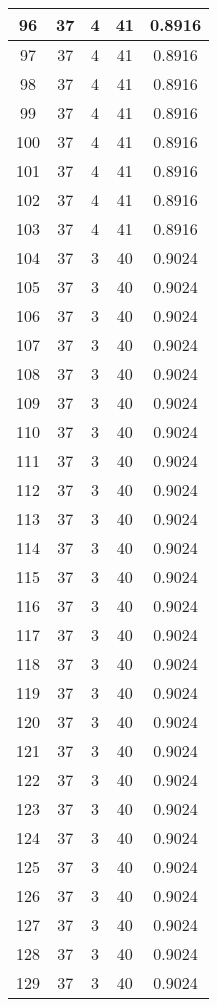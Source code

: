 \documentclass[letterpaper, 12pt]{article}
\begin{document}
\begin{longtable}{|c|c|c|c|c|}
\hline
96 & 37 & 4 & 41 & 0.8916 \\
\hline
97 & 37 & 4 & 41 & 0.8916 \\
\hline
98 & 37 & 4 & 41 & 0.8916 \\
\hline
99 & 37 & 4 & 41 & 0.8916 \\
\hline
100 & 37 & 4 & 41 & 0.8916 \\
\hline
101 & 37 & 4 & 41 & 0.8916 \\
\hline
102 & 37 & 4 & 41 & 0.8916 \\
\hline
103 & 37 & 4 & 41 & 0.8916 \\
\hline
104 & 37 & 3 & 40 & 0.9024 \\
\hline
105 & 37 & 3 & 40 & 0.9024 \\
\hline
106 & 37 & 3 & 40 & 0.9024 \\
\hline
107 & 37 & 3 & 40 & 0.9024 \\
\hline
108 & 37 & 3 & 40 & 0.9024 \\
\hline
109 & 37 & 3 & 40 & 0.9024 \\
\hline
110 & 37 & 3 & 40 & 0.9024 \\
\hline
111 & 37 & 3 & 40 & 0.9024 \\
\hline
112 & 37 & 3 & 40 & 0.9024 \\
\hline
113 & 37 & 3 & 40 & 0.9024 \\
\hline
114 & 37 & 3 & 40 & 0.9024 \\
\hline
115 & 37 & 3 & 40 & 0.9024 \\
\hline
116 & 37 & 3 & 40 & 0.9024 \\
\hline
117 & 37 & 3 & 40 & 0.9024 \\
\hline
118 & 37 & 3 & 40 & 0.9024 \\
\hline
119 & 37 & 3 & 40 & 0.9024 \\
\hline
120 & 37 & 3 & 40 & 0.9024 \\
\hline
121 & 37 & 3 & 40 & 0.9024 \\
\hline
122 & 37 & 3 & 40 & 0.9024 \\
\hline
123 & 37 & 3 & 40 & 0.9024 \\
\hline
124 & 37 & 3 & 40 & 0.9024 \\
\hline
125 & 37 & 3 & 40 & 0.9024 \\
\hline
126 & 37 & 3 & 40 & 0.9024 \\
\hline
127 & 37 & 3 & 40 & 0.9024 \\
\hline
128 & 37 & 3 & 40 & 0.9024 \\
\hline
129 & 37 & 3 & 40 & 0.9024 \\

\end{longtable}
\end{document}
